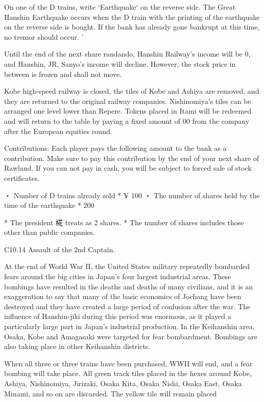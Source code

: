 \documentclass{article}
\begin{document}
\begin{CJK}{UTF8}{min}
On one of the D trains, write `Earthquake` on the reverse side. The Great Hanshin Earthquake occurs when the D train with the printing of the earthquake on the reverse side is bought. If the bank has already gone bankrupt at this time, no tremor should occur. '

Until the end of the next share randando, Hanshin Railway's income will be 0, and Hanshin, JR, Sanyo's income will decline. However, the stock price in between is frozen and shall not move.

Kobe high-speed railway is closed, the tiles of Kobe and Ashiya are removed, and they are returned to the original railway companies. Nishinomiya's tiles can be arranged one level lower than Repere. Tokens placed in Itami will be redeemed and will return to the table by paying a fixed amount of 00 from the company after the European equities round.

Contributions: Each player pays the following amount to the bank as a contribution. Make sure to pay this contribution by the end of your next share of Rawland. If you can not pay in cash, you will be subject to forced sale of stock certificates.

・ Number of D trains already sold * ¥ 100
・ The number of shares held by the time of the earthquake * 200

* The president 椛 treats as 2 shares.
* The number of shares includes those other than public companies.

C10.14 Assault of the 2nd Captain.

At the end of World War II, the United States military repeatedly
bombarded fears around the big cities in Japan's four largest
industrial areas. These bombings have resulted in the deaths and
deaths of many civilians, and it is an exaggeration to say that many
of the basic economics of Jochang have been destroyed and they have
created a large period of confusion after the war. The influence of
Hanshin-jiki during this period was enormous, as it played a
particularly large part in Japan's industrial production. In the
Keihanshin area, Osaka, Kobe and Amagasaki were targeted for fear
bombardment. Bombings are also taking place in other Keihanshin
districts.

When all three or three trains have been purchased, WWII will end, and
a fear bombing will take place. All green track tiles placed in the
hexes around Kobe, Ashiya, Nishinomiya, Jirizaki, Osaka Kita, Osaka
Nishi, Osaka East, Osaka Minami, and so on are discarded. The yellow
tile will remain placed


\end{CJK}
\end{document}
